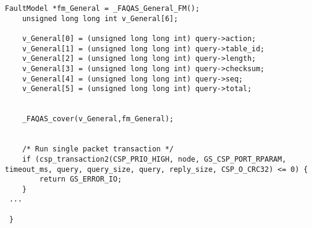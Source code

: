 \begin{lstlisting}[style=CStyle, caption=Example of extended data-driven mutation probe for libParam, label=GSLcover]
    FaultModel *fm_General = _FAQAS_General_FM();
    unsigned long long int v_General[6];

    v_General[0] = (unsigned long long int) query->action;
    v_General[1] = (unsigned long long int) query->table_id;
    v_General[2] = (unsigned long long int) query->length;
    v_General[3] = (unsigned long long int) query->checksum;
    v_General[4] = (unsigned long long int) query->seq;
    v_General[5] = (unsigned long long int) query->total;


    _FAQAS_cover(v_General,fm_General);


    /* Run single packet transaction */
    if (csp_transaction2(CSP_PRIO_HIGH, node, GS_CSP_PORT_RPARAM, timeout_ms, query, query_size, query, reply_size, CSP_O_CRC32) <= 0) {
        return GS_ERROR_IO;
    }
 ... 
 
 }

\end{lstlisting}



%
%
%
